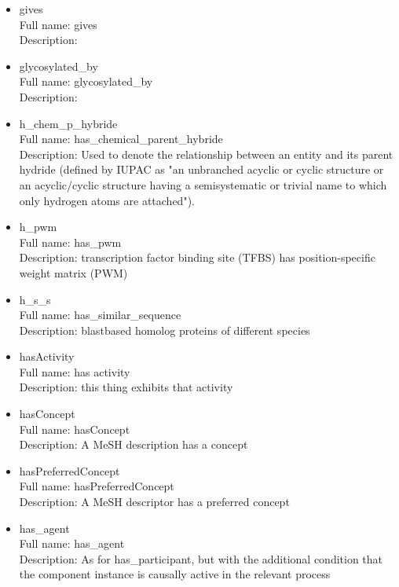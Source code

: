 \begin{itemize}
\item{gives}\\ Full name: gives\\ Description: 

\item{glycosylated\_by}\\ Full name: glycosylated\_by\\ Description: 

\item{h\_chem\_p\_hybride}\\ Full name: has\_chemical\_parent\_hybride\\ Description: Used to denote the relationship between an entity and its parent hydride (defined by IUPAC as "an unbranched acyclic or cyclic structure or an acyclic/cyclic structure having a semisystematic or trivial name to which only hydrogen atoms are attached"). 

\item{h\_pwm}\\ Full name: has\_pwm\\ Description: transcription factor binding site (TFBS) has position-specific weight matrix (PWM) 

\item{h\_s\_s}\\ Full name: has\_similar\_sequence\\ Description: blastbased homolog proteins of different species 

\item{hasActivity}\\ Full name: has activity\\ Description: this thing exhibits that activity 

\item{hasConcept}\\ Full name: hasConcept\\ Description: A MeSH description has a concept 

\item{hasPreferredConcept}\\ Full name: hasPreferredConcept\\ Description: A MeSH descriptor has a preferred concept 

\item{has\_agent}\\ Full name: has\_agent\\ Description: As for has\_participant, but with the additional condition that the component instance is causally active in the relevant process 


\end{itemize}
